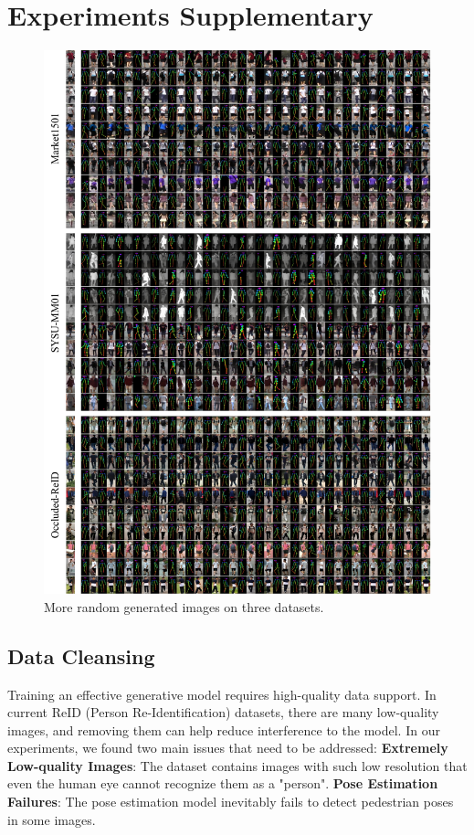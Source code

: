 \section{Experiments Supplementary}
\begin{figure}
\centering
\includegraphics[width=\linewidth]{figs/pdf/random_l.pdf}
\caption{More random generated images on three datasets.}
\label{fig:random_all}
\end{figure}
\subsection{Data Cleansing}
Training an effective generative model requires high-quality data support. In current ReID (Person Re-Identification) datasets, there are many low-quality images, and removing them can help reduce interference to the model. In our experiments, we found two main issues that need to be addressed: \textbf{Extremely Low-quality Images}: The dataset contains images with such low resolution that even the human eye cannot recognize them as a "person". \textbf{Pose Estimation Failures}: The pose estimation model inevitably fails to detect pedestrian poses in some images.

